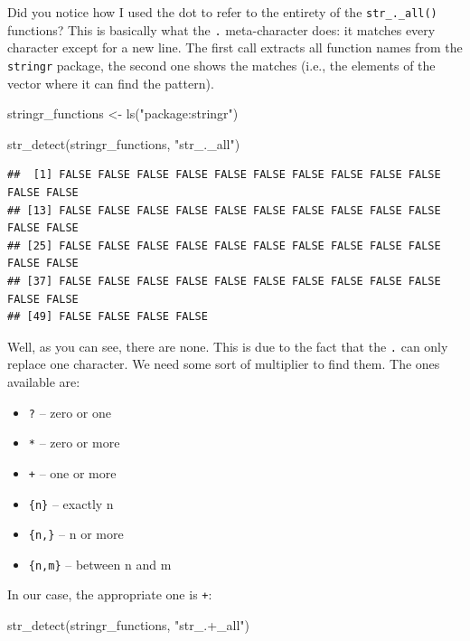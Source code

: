 \documentclass[
]{book}
\newenvironment{Shaded}{\begin{snugshade}}{\end{snugshade}}
\newcommand{\FunctionTok}[1]{\textcolor[rgb]{0.00,0.00,0.00}{#1}}
\newcommand{\NormalTok}[1]{#1}
\newcommand{\OtherTok}[1]{\textcolor[rgb]{0.56,0.35,0.01}{#1}}
\newcommand{\StringTok}[1]{\textcolor[rgb]{0.31,0.60,0.02}{#1}}
\providecommand{\tightlist}{%
  \setlength{\itemsep}{0pt}\setlength{\parskip}{0pt}}
\begin{document}
Did you notice how I used the dot to refer to the entirety of the \texttt{str\_.\_all()} functions? This is basically what the \texttt{.} meta-character does: it matches every character except for a new line. The first call extracts all function names from the \texttt{stringr} package, the second one shows the matches (i.e., the elements of the vector where it can find the pattern).

\begin{Shaded}
\begin{Highlighting}[]
\NormalTok{stringr\_functions }\OtherTok{\textless{}{-}} \FunctionTok{ls}\NormalTok{(}\StringTok{"package:stringr"}\NormalTok{)}

\FunctionTok{str\_detect}\NormalTok{(stringr\_functions, }\StringTok{"str\_.\_all"}\NormalTok{)}
\end{Highlighting}
\end{Shaded}

\begin{verbatim}
##  [1] FALSE FALSE FALSE FALSE FALSE FALSE FALSE FALSE FALSE FALSE FALSE FALSE
## [13] FALSE FALSE FALSE FALSE FALSE FALSE FALSE FALSE FALSE FALSE FALSE FALSE
## [25] FALSE FALSE FALSE FALSE FALSE FALSE FALSE FALSE FALSE FALSE FALSE FALSE
## [37] FALSE FALSE FALSE FALSE FALSE FALSE FALSE FALSE FALSE FALSE FALSE FALSE
## [49] FALSE FALSE FALSE FALSE
\end{verbatim}

Well, as you can see, there are none. This is due to the fact that the \texttt{.} can only replace one character. We need some sort of multiplier to find them. The ones available are:

\begin{itemize}
\tightlist
\item
  \texttt{?} -- zero or one
\item
  \texttt{*} -- zero or more
\item
  \texttt{+} -- one or more
\item
  \texttt{\{n\}} -- exactly n
\item
  \texttt{\{n,\}} -- n or more
\item
  \texttt{\{n,m\}} -- between n and m
\end{itemize}

In our case, the appropriate one is \texttt{+}:

\begin{Shaded}
\begin{Highlighting}[]
\FunctionTok{str\_detect}\NormalTok{(stringr\_functions, }\StringTok{"str\_.+\_all"}\NormalTok{)}
\end{Highlighting}
\end{Shaded}
\end{document}
